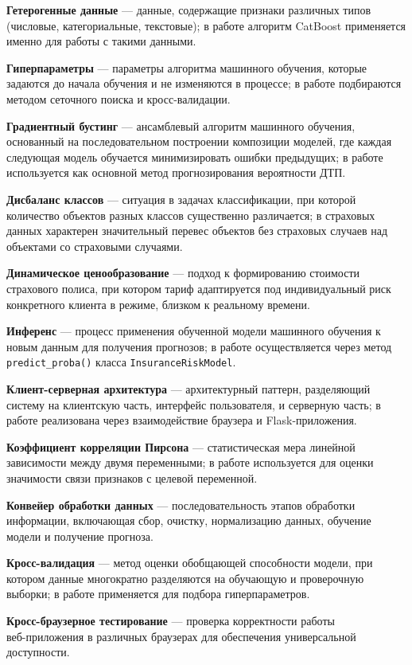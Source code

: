 \textbf{Гетерогенные данные} --- данные, содержащие признаки различных типов (числовые, категориальные, текстовые); в работе алгоритм CatBoost применяется именно для работы с такими данными.

\textbf{Гиперпараметры} --- параметры алгоритма машинного обучения, которые задаются до начала обучения и не изменяются в процессе; в работе подбираются методом сеточного поиска и кросс-валидации.

\textbf{Градиентный бустинг} --- ансамблевый алгоритм машинного обучения, основанный на последовательном построении композиции моделей, где каждая следующая модель обучается минимизировать ошибки предыдущих; в работе используется как основной метод прогнозирования вероятности ДТП.

\textbf{Дисбаланс классов} --- ситуация в задачах классификации, при которой количество объектов разных классов существенно различается; в страховых данных характерен значительный перевес объектов без страховых случаев над объектами со страховыми случаями.

\textbf{Динамическое ценообразование} --- подход к формированию стоимости страхового полиса, при котором тариф адаптируется под индивидуальный риск конкретного клиента в режиме, близком к реальному времени.

\textbf{Инференс} --- процесс применения обученной модели машинного обучения к новым данным для получения прогнозов; в работе осуществляется через метод \texttt{predict\_proba()} класса \texttt{InsuranceRiskModel}.

\textbf{Клиент-серверная архитектура} --- архитектурный паттерн, разделяющий систему на клиентскую часть, интерфейс пользователя, и серверную часть; в работе реализована через взаимодействие браузера и Flask-приложения.

\textbf{Коэффициент корреляции Пирсона} --- статистическая мера линейной зависимости между двумя переменными; в работе используется для оценки значимости связи признаков с целевой переменной.

\textbf{Конвейер обработки данных} --- последовательность этапов обработки информации, включающая сбор, очистку, нормализацию данных, обучение модели и получение прогноза.

\textbf{Кросс-валидация} --- метод оценки обобщающей способности модели, при котором данные многократно разделяются на обучающую и проверочную выборки; в работе применяется для подбора гиперпараметров.

\textbf{Кросс-браузерное тестирование} --- проверка корректности работы \\
веб-приложения в различных браузерах для обеспечения универсальной доступности.

